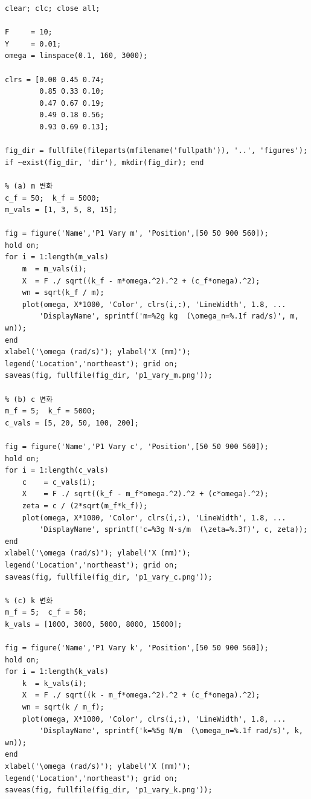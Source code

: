 \documentclass[12pt, a4paper]{article}
\begin{document}
\begin{lstlisting}[caption={solve.m — 문제 1: 조화 외력 가진}]
clear; clc; close all;

F     = 10;
Y     = 0.01;
omega = linspace(0.1, 160, 3000);

clrs = [0.00 0.45 0.74;
        0.85 0.33 0.10;
        0.47 0.67 0.19;
        0.49 0.18 0.56;
        0.93 0.69 0.13];

fig_dir = fullfile(fileparts(mfilename('fullpath')), '..', 'figures');
if ~exist(fig_dir, 'dir'), mkdir(fig_dir); end

% (a) m 변화
c_f = 50;  k_f = 5000;
m_vals = [1, 3, 5, 8, 15];

fig = figure('Name','P1 Vary m', 'Position',[50 50 900 560]);
hold on;
for i = 1:length(m_vals)
    m  = m_vals(i);
    X  = F ./ sqrt((k_f - m*omega.^2).^2 + (c_f*omega).^2);
    wn = sqrt(k_f / m);
    plot(omega, X*1000, 'Color', clrs(i,:), 'LineWidth', 1.8, ...
        'DisplayName', sprintf('m=%2g kg  (\omega_n=%.1f rad/s)', m, wn));
end
xlabel('\omega (rad/s)'); ylabel('X (mm)');
legend('Location','northeast'); grid on;
saveas(fig, fullfile(fig_dir, 'p1_vary_m.png'));

% (b) c 변화
m_f = 5;  k_f = 5000;
c_vals = [5, 20, 50, 100, 200];

fig = figure('Name','P1 Vary c', 'Position',[50 50 900 560]);
hold on;
for i = 1:length(c_vals)
    c    = c_vals(i);
    X    = F ./ sqrt((k_f - m_f*omega.^2).^2 + (c*omega).^2);
    zeta = c / (2*sqrt(m_f*k_f));
    plot(omega, X*1000, 'Color', clrs(i,:), 'LineWidth', 1.8, ...
        'DisplayName', sprintf('c=%3g N·s/m  (\zeta=%.3f)', c, zeta));
end
xlabel('\omega (rad/s)'); ylabel('X (mm)');
legend('Location','northeast'); grid on;
saveas(fig, fullfile(fig_dir, 'p1_vary_c.png'));

% (c) k 변화
m_f = 5;  c_f = 50;
k_vals = [1000, 3000, 5000, 8000, 15000];

fig = figure('Name','P1 Vary k', 'Position',[50 50 900 560]);
hold on;
for i = 1:length(k_vals)
    k  = k_vals(i);
    X  = F ./ sqrt((k - m_f*omega.^2).^2 + (c_f*omega).^2);
    wn = sqrt(k / m_f);
    plot(omega, X*1000, 'Color', clrs(i,:), 'LineWidth', 1.8, ...
        'DisplayName', sprintf('k=%5g N/m  (\omega_n=%.1f rad/s)', k, wn));
end
xlabel('\omega (rad/s)'); ylabel('X (mm)');
legend('Location','northeast'); grid on;
saveas(fig, fullfile(fig_dir, 'p1_vary_k.png'));
\end{lstlisting}
\end{document}
